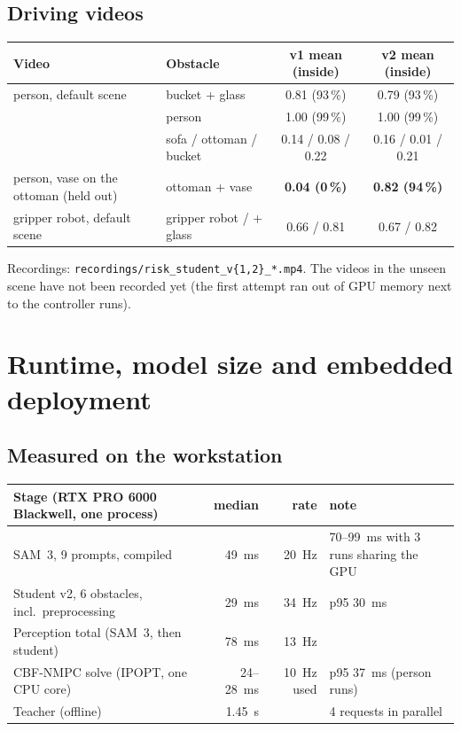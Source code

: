 \documentclass[10pt,a4paper]{article}
\newcommand{\code}[1]{\texttt{#1}}
\begin{document}
\subsection{Driving videos}
\begin{center}\small
\begin{tabular}{llcc}
\toprule
Video & Obstacle & v1 mean (inside) & v2 mean (inside) \\
\midrule
person, default scene & bucket + glass & 0.81 (93\,\%) & 0.79 (93\,\%) \\
 & person & 1.00 (99\,\%) & 1.00 (99\,\%) \\
 & sofa / ottoman / bucket & 0.14 / 0.08 / 0.22 & 0.16 / 0.01 / 0.21 \\
person, vase on the ottoman (held out) & ottoman + vase & \textbf{0.04 (0\,\%)} & \textbf{0.82 (94\,\%)} \\
gripper robot, default scene & gripper robot / + glass & 0.66 / 0.81 & 0.67 / 0.82 \\
\bottomrule
\end{tabular}
\end{center}
Recordings: \code{recordings/risk\_student\_v\{1,2\}\_*.mp4}. The videos in the unseen scene have not been recorded yet (the first
attempt ran out of GPU memory next to the controller runs).

\section{Runtime, model size and embedded deployment}\label{sec:runtime}

\subsection{Measured on the workstation}
\begin{center}\small
\begin{tabular}{lrrl}
\toprule
Stage (RTX PRO 6000 Blackwell, one process) & median & rate & note \\
\midrule
SAM~3, 9 prompts, compiled & 49~ms & 20~Hz & 70--99~ms with 3 runs sharing the GPU \\
Student v2, 6 obstacles, incl.\ preprocessing & 29~ms & 34~Hz & p95 30~ms \\
Perception total (SAM~3, then student) & 78~ms & 13~Hz & \\
CBF-NMPC solve (IPOPT, one CPU core) & 24--28~ms & 10~Hz used & p95 37~ms (person runs) \\
Teacher (offline) & 1.45~s & & 4 requests in parallel \\
\bottomrule
\end{tabular}
\end{center}
\end{document}
